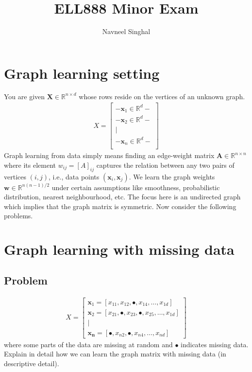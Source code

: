 \documentclass[a4paper]{article}
\title{\textbf{ELL888 Minor Exam}}
\author{Navneel Singhal}
\date{}
\newcommand{\mf}{\mathbf}
\newcommand{\R}{\mathbb{R}}
\begin{document}
\maketitle
\tableofcontents

\section{Graph learning setting}

You are given $\mf{X} \in \R^{n \times d}$ whose rows reside on the vertices of an unknown graph.
\begin{align*}
    X = \begin{bmatrix}
        - \mf{x}_1 \in \R^d -\\
        - \mf{x}_2 \in \R^d -\\
            \mid \\
        - \mf{x}_n \in \R^d -\\
    \end{bmatrix}
\end{align*}
Graph learning from data simply means finding an edge-weight matrix $\mf{A} \in \R^{n \times n}$ where its element $w_{ij} = {[A]}_{ij}$ captures the relation between any two pairs of vertices $(i,
j)$, i.e., data points $(\mf{x}_i, \mf{x}_j)$. We learn the graph weights $\mf{w} \in \R^{n(n - 1)/2}$ under certain assumptions like smoothness, probabilistic distribution, nearest
neighbourhood, etc. The focus here is an undirected graph which implies that the graph matrix is symmetric. Now consider the following problems.

\section{Graph learning with missing data}

\subsection{Problem}
\begin{align*}
    X = \begin{bmatrix}
        \mf{x}_1 = [x_{11}, x_{12}, \bullet, x_{14}, \ldots, x_{1d}]\\
        \mf{x}_2 = [x_{21}, \bullet, x_{23}, \bullet, x_{25}, \ldots, x_{1d}]\\
        \mid\\
        \mf{x_n} = [\bullet, x_{n2}, \bullet, x_{n4}, \ldots, x_{nd}]
    \end{bmatrix}
\end{align*}
where some parts of the data are missing at random and $\bullet$ indicates missing data. Explain in detail how we can learn the graph matrix with missing data (in descriptive detail).
\end{document}
